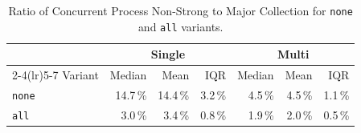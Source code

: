 \begin{table}[ht]
\centering
\caption{Ratio of Concurrent Process Non-Strong to Major Collection for \texttt{none} and \texttt{all} variants.}
\label{tab:stats-ratio-slurm-5118807_combined_gc}
\begin{tabular}{l rrr rrr}
\toprule
 & \multicolumn{3}{c}{Single} & \multicolumn{3}{c}{Multi} \\
\cmidrule(lr){2-4}\cmidrule(lr){5-7}
Variant & Median & Mean & IQR & Median & Mean & IQR \\
\midrule
\texttt{none} & 14.7\,\% & 14.4\,\% & 3.2\,\% & 4.5\,\% & 4.5\,\% & 1.1\,\% \\
\texttt{all} & 3.0\,\% & 3.4\,\% & 0.8\,\% & 1.9\,\% & 2.0\,\% & 0.5\,\% \\
\bottomrule
\end{tabular}
\end{table}
